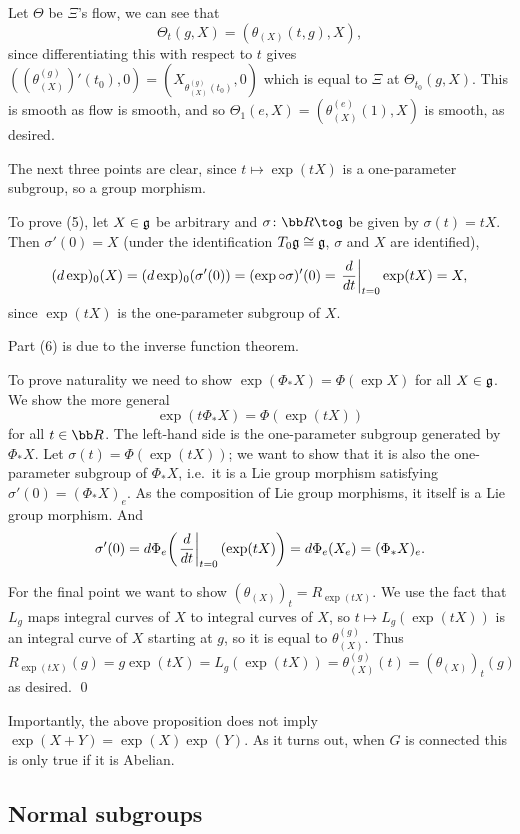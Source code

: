     Let $\Theta$ be $\Xi$'s flow, we can see that
    $$ \Theta_t(g,X) = (\theta_{(X)}(t,g),X) , $$
    since differentiating this with respect to $t$ gives $((\theta_{(X)}^{(g)})'(t_0),0)=(X_{\theta_{(X)}^{(g)}(t_0)},0)$ which is equal
    to $\Xi$ at $\Theta_{t_0}(g,X)$.
    This is smooth as flow is smooth, and so $\Theta_1(e,X)=(\theta_{(X)}^{(e)}(1),X)$ is smooth, as desired.

    The next three points are clear, since $t\mapsto\exp(tX)$ is a one-parameter subgroup, so a group morphism.

    To prove (5), let $X\in{{\frak g}}$ be arbitrary and $\sigma\colon\bR\to\g$ be given by $\sigma(t)=tX$.
    Then $\sigma'(0)=X$ (under the identification $T_0{{\frak g}}\cong{{\frak g}}$, $\sigma$ and $X$ are identified),
    $$ (d\exp)_0(X) = (d\exp)_0(\sigma'(0)) = (\exp\circ\sigma)'(0) = \left.{{d}\over{dt}}\right|_{t=0}\exp(tX) = X , $$
    since $\exp(tX)$ is the one-parameter subgroup of $X$.

    Part (6) is due to the inverse function theorem.

    To prove naturality we need to show $\exp(\Phi_*X)=\Phi(\exp X)$ for all $X\in{{\frak g}}$.
    We show the more general
    $$ \exp(t\Phi_*X) = \Phi(\exp(tX)) $$
    for all $t\in\bR$.
    The left-hand side is the one-parameter subgroup generated by $\Phi_*X$.
    Let $\sigma(t)=\Phi(\exp(tX))$; we want to show that it is also the one-parameter subgroup of $\Phi_*X$, i.e.\ it is a Lie group
    morphism satisfying $\sigma'(0)=(\Phi_*X)_e$.
    As the composition of Lie group morphisms, it itself is a Lie group morphism.
    And
    $$ \sigma'(0) = d\Phi_e\mathopen{}\mathclose{\left(\left.{{d}\over{dt}}\right|_{t=0}(\exp(tX)\right)} = d\Phi_e(X_e) = (\Phi_*X)_e . $$

    For the final point we want to show $(\theta_{(X)})_t=R_{\exp(tX)}$.
    We use the fact that $L_g$ maps integral curves of $X$ to integral curves of $X$, so $t\mapsto L_g(\exp(tX))$ is an integral curve of $X$
    starting at $g$, so it is equal to $\theta_{(X)}^{(g)}$.
    Thus
    $$ R_{\exp(tX)}(g) = g\exp(tX) = L_g(\exp(tX)) = \theta^{(g)}_{(X)}(t) = (\theta_{(X)})_t(g) $$
    as desired.
    \qed

\eproof

\bnote

    Importantly, the above proposition does not imply $\exp(X+Y)=\exp(X)\exp(Y)$.
    As it turns out, when $G$ is connected this is only true if it is Abelian.

\enote

\subsection{Normal subgroups}

